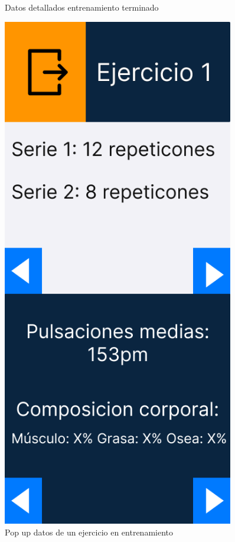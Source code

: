 \begin{figure}[H]
\begin{minipage}{0.45\textwidth}
      \caption{Datos detallados entrenamiento terminado}
      \label{fig:Datos detallados entrenamiento terminado}
   \end{minipage}%
   \hspace{0.5cm}
   \begin{minipage}{0.45\textwidth}
      \centering
      \includegraphics[width=0.9\textwidth]{fotos/Frame 35.png}
      \caption{Pop up datos de un ejercicio en entrenamiento}
      \label{fig:Pop up datos de un ejercicio en entrenamiento}
   \end{minipage}
\end{figure}


